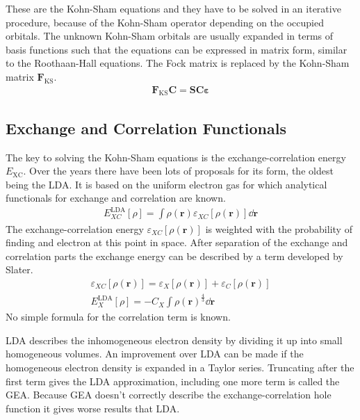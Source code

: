 %
These are the Kohn-Sham equations and they have to be solved in an iterative
procedure, because of the Kohn-Sham operator depending on the occupied
orbitals.  The unknown Kohn-Sham orbitals are usually expanded in terms of
basis functions such that the equations can be expressed in matrix form,
similar to the Roothaan-Hall equations. The Fock matrix is replaced by the
Kohn-Sham matrix $\mathbf{F}_\text{KS}$.
%
\begin{align}
    \mathbf{F}_\text{KS}\mathbf{C} = \mathbf{SC\varepsilon}
\end{align}
%
\subsection{Exchange and Correlation Functionals}
\label{sec:exchangecorrelationfunctionals}

The key to solving the Kohn-Sham equations is the exchange-correlation energy
$E_\text{XC}$. Over the years there have been lots of proposals for its form,
the oldest being the \ac{LDA}. It is based on the uniform electron gas for
which analytical functionals for exchange and correlation are known.
%
\begin{align}
    E_{XC}^\text{LDA}\left[\rho\right]=\int\rho(\mathbf{r})\varepsilon_{XC}\left[\rho(\mathbf{r})\right]\dd\mathbf{r}
\end{align}
%
The exchange-correlation energy $\varepsilon_{XC}\left[\rho(\mathbf{r})\right]$
is weighted with the probability of finding and electron at this point in
space. After separation of the exchange and correlation parts the exchange
energy can be described by a term developed by Slater.
%
\begin{align}
	\varepsilon_{XC}\left[\rho(\mathbf{r})\right] = \varepsilon_{X}\left[\rho(\mathbf{r})\right] + \varepsilon_{C}\left[\rho(\mathbf{r})\right]\\
	E_{X}^\text{LDA}\left[\rho\right] = -C_X\int\rho(\mathbf{r})^{\frac{4}{3}}\dd\mathbf{r}
\end{align}
%
No simple formula for the correlation term is known.

\ac{LDA} describes the inhomogeneous electron density by dividing it up into
small homogeneous volumes. An improvement over \ac{LDA} can be made if the
homogeneous electron density is expanded in a Taylor series. Truncating after the
first term gives the \ac{LDA} approximation, including one more term is called
the \ac{GEA}. Because \ac{GEA} doesn't correctly describe the
exchange-correlation hole function it gives worse results that \ac{LDA}.

